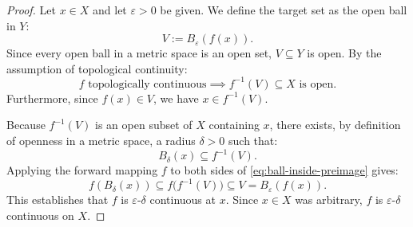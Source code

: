 \begin{content}

\begin{proof}
Let $x \in X$ and let $\varepsilon > 0$ be given. We define the target set as the open ball in $Y$:
\begin{equation}\label{eq:choice-of-v}
V := B_\varepsilon(f(x)).
\end{equation}
Since every open ball in a metric space is an open set, $V \subseteq Y$ is open. By the assumption of topological continuity:
\begin{equation}\label{eq:preimage-open}
f \text{ topologically continuous} \implies f^{-1}(V) \subseteq X \text{ is open}.
\end{equation}
Furthermore, since $f(x) \in V$, we have $x \in f^{-1}(V)$.

Because $f^{-1}(V)$ is an open subset of $X$ containing $x$, there exists, by definition of openness in a metric space, a radius $\delta > 0$ such that:
\begin{equation}\label{eq:ball-inside-preimage}
B_\delta(x) \subseteq f^{-1}(V).
\end{equation}
Applying the forward mapping $f$ to both sides of \eqref{eq:ball-inside-preimage} gives:
\begin{equation}\label{eq:final-inclusion}
f(B_\delta(x)) \subseteq f\bigl(f^{-1}(V)\bigr) \subseteq V = B_\varepsilon(f(x)).
\end{equation}
This establishes that $f$ is $\varepsilon$-$\delta$ continuous at $x$. Since $x \in X$ was arbitrary, $f$ is $\varepsilon$-$\delta$ continuous on $X$.
\end{proof}
\end{content}

\begin{hidden}
\end{hidden}

